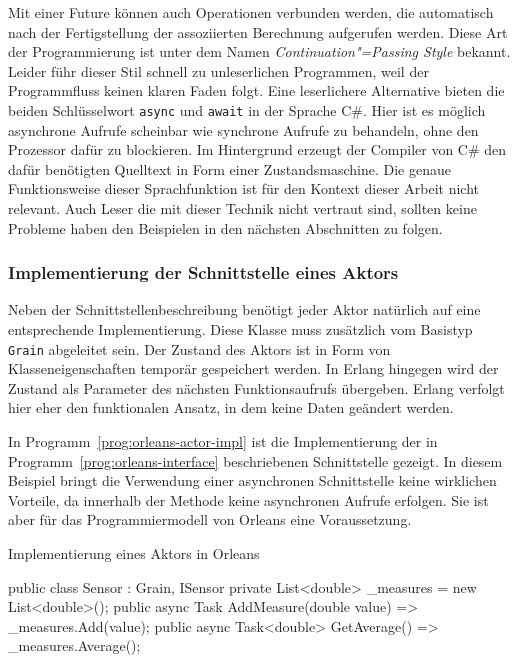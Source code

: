 Mit einer Future können auch Operationen verbunden werden, die automatisch nach der Fertigstellung der assoziierten Berechnung aufgerufen werden. Diese Art der Programmierung ist unter dem Namen \textit{Continuation"=Passing Style} bekannt. Leider führ dieser Stil schnell zu unleserlichen Programmen, weil der Programmfluss keinen klaren Faden folgt. Eine leserlichere Alternative bieten die beiden Schlüsselwort \lstinline{async} und \lstinline{await} in der Sprache C\#. Hier ist es möglich asynchrone Aufrufe scheinbar wie synchrone Aufrufe zu behandeln, ohne den Prozessor dafür zu blockieren. Im Hintergrund erzeugt der Compiler von C\# den dafür benötigten Quelltext in Form einer Zustandsmaschine. Die genaue Funktionsweise dieser Sprachfunktion ist für den Kontext dieser Arbeit nicht relevant. Auch Leser die mit dieser Technik nicht vertraut sind, sollten keine Probleme haben den Beispielen in den nächsten Abschnitten zu folgen.

\subsubsection{Implementierung der Schnittstelle eines Aktors}

Neben der Schnittstellenbeschreibung benötigt jeder Aktor natürlich auf eine entsprechende Implementierung. Diese Klasse muss zusätzlich vom Basistyp \lstinline{Grain} abgeleitet sein. Der Zustand des Aktors ist in Form von Klasseneigenschaften temporär gespeichert werden. In Erlang hingegen wird der Zustand als Parameter des nächsten Funktionsaufrufs übergeben. Erlang verfolgt hier eher den funktionalen Ansatz, in dem keine Daten geändert werden.

In Programm~\ref{prog:orleans-actor-impl} ist die Implementierung der in Programm~\ref{prog:orleans-interface} beschriebenen Schnittstelle gezeigt. In diesem Beispiel bringt die Verwendung einer asynchronen Schnittstelle keine wirklichen Vorteile, da innerhalb der Methode keine asynchronen Aufrufe erfolgen. Sie ist aber für das Programmiermodell von Orleans eine Voraussetzung.

\begin{program}[!hbt]
\caption{Implementierung eines Aktors in Orleans}
\label{prog:orleans-actor-impl}
\begin{CsCode}
public class Sensor : Grain, ISensor {
	private List<double> _measures = new List<double>();
	public async Task AddMeasure(double value) => _measures.Add(value);
	public async Task<double> GetAverage() => _measures.Average();
}
\end{CsCode}
\end{program}

